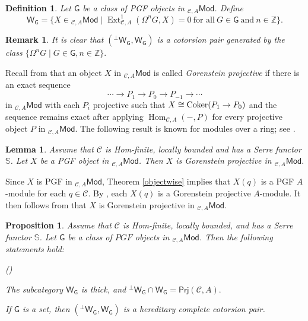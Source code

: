 \documentclass{amsart}
\theoremstyle{bfupright head,slanted body}
\theoremstyle{bfupright head,upright body}
\theoremstyle{fixed bf head,slanted body}
\newtheorem{prp}[res]{Proposition}      \newtheorem*{prp*}{Proposition}
\newtheorem{lem}[res]{Lemma}            \newtheorem*{lem*}{Lemma}
\theoremstyle{fixed bf head,upright body}
\newtheorem{dfn}[res]{Definition}       \newtheorem*{dfn*}{Definition}
\newtheorem{rmk}[res]{Remark}           \newtheorem*{rmk*}{Remark}
\theoremstyle{numbered paragraph}
\newlength{\thmlistleft}        %
\newlength{\thmlistright}       %
\newlength{\thmlistpartopsep}   %
\newlength{\thmlisttopsep}      %
\newlength{\thmlistparsep}      %
\newlength{\thmlistitemsep}     %
\newcounter{prt}
\newenvironment{prt}{\begin{list}{\upshape (\alph{prt})}%
		{\usecounter{prt}%
			\setlength{\leftmargin}{\thmlistleft}%
			\setlength{\labelwidth}{\thmlistleft}%
			\setlength{\rightmargin}{\thmlistright}%
			\setlength{\partopsep}{\thmlistpartopsep}%
			\setlength{\topsep}{\thmlisttopsep}%
			\setlength{\parsep}{\thmlistparsep}%
			\setlength{\itemsep}{\thmlistitemsep}}}%
	{\end{list}}%
\newenvironment{prf*}[1][Proof]{%
	\begin{proof}[\bf #1]
		\setcounter{equation}{0}
		\renewcommand{\theequation}{\arabic{equation}}}
	{\end{proof}
}
\numberwithin{equation}{res}
\newcommand{\Mod}[1]{{_{#1}\mathsf{Mod}}}
\newcommand{\Prj}[1]{\mathsf{Prj}(#1)}
\newcommand{\Hom}[3][]{\operatorname{Hom}_{#1}(#2,#3)}
\newcommand{\Ext}[4][]{\operatorname{Ext}_{#1}^{#2}(#3,#4)}
\newcommand{\Coker}[1]{\nobreak{\operatorname{Coker}#1}}
\newcommand{\G}{\mathsf{G}}
\newcommand{\WG}{\mathsf{W}_{\mathsf{G}}}
\newcommand{\W}{\mathsf{W}}
\newcommand{\C}{\mathcal{C}}
\begin{document}
\begin{dfn}
Let $\G$ be a class of PGF objects in $\Mod{\C,A}$. Define
\[\W_{\G} = \{X\in \Mod{\C,A}\mid \Ext[\C,A]{1}{\Omega^{n}G}{X}=0 \ \text{for all} \ G\in \G \ \text{and}\ n\in \mathbb{Z}\}.\]
\end{dfn}

\begin{rmk}\label{generate}
It is clear that $(^{\bot}\WG,\WG)$ is a cotorsion pair generated by the class $\{\Omega^{n}G\mid G\in \G, n\in \mathbb{Z}\}.$
\end{rmk}

Recall from \cite{rha} that an object $X$ in $\Mod{\C, A}$ is called \emph{Gorenstein projective} if there is an exact sequence
\[\cdots \to P_{1}\to P_{0}\to P_{-1} \to \cdots\]
in $\Mod{\C,A}$ with each $P_{i}$ projective such that $X\cong\Coker{(P_{1}\to P_{0})}$ and the sequence remains exact after applying $\Hom[\C,A]{-}{P}$ for every projective object $P$ in $\Mod{\C,A}$. The following result is known for modules over a ring; see \cite[Theorem 4.4]{SS20}.

\begin{lem}\label{lem:PGF-GP}
Assume that $\C$ is Hom-finite, locally bounded and has a Serre functor $\mathbb{S}$. Let $X$ be a PGF object in $\Mod{\C,A}$. Then $X$ is Gorenstein projective in $\Mod{\C,A}.$
\end{lem}

\begin{prf*}
Since $X$ is PGF in $\Mod{\C,A}$, Theorem \ref{objectwise} implies that $X(q)$ is a PGF $A$-module for each $q\in\C$. By \cite[Theorem 4.4]{SS20}, each $X(q)$ is a Gorenstein projective $A$-module.
It then follows from \cite[Theorem B]{DLLM} that $X$ is Gorenstein projective in $\Mod{\C,A}$.
\end{prf*}

\begin{prp}\label{prop:PGF-cotorsion pair}
Assume that $\C$ is Hom-finite, locally bounded, and has a Serre functor $\mathbb{S}$. Let $\G$ be a class of $PGF$ objects in $\Mod{\C,A}$.
Then the following statements hold:
\begin{prt}
\item The subcategory $\WG$ is thick, and $^{\bot}\WG\cap\WG=\Prj{\C,A}.$
\item If $\G$ is a set, then $(^{\bot}\WG,\WG)$ is a hereditary complete cotorsion
      pair.
\end{prt}
\end{prp}
\end{document}
